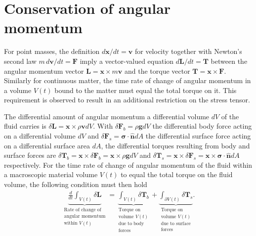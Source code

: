 \section{Conservation of angular momentum}
For point masses, the definition $d\bm{x}/dt=\bm{v}$ for velocity together with Newton's second law $m\,d\bm{v}/dt=\bm{F}$ imply a vector-valued equation $d\bm{L}/dt=\bm{T}$ between the angular momentum vector $\bm{L}=\bm{x}\times m\bm{v}$ and the torque vector $\bm{T}=\bm{x}\times\bm{F}$. Similarly for continuous matter, the time rate of change of angular momentum in a volume $V(t)$ bound to the matter must equal the total torque on it. This requirement is observed to result in an additional restriction on the stress tensor.

The differential amount of angular momentum a differential volume $dV$ of the fluid carries is $\delta\bm{L}=\bm{x}\times \rho\bm{v}dV$. With $\delta\bm{F}_b=\rho\bm{g}dV$ the differential body force acting on a differential volume $dV$ and $\delta\bm{F}_s=\bm{\sigma}\cdot\bm{\hat{n}}dA$ the differential surface force acting on a differential surface area $dA$, the differential torques resulting from body and surface forces are $\delta\bm{T}_b=\bm{x}\times\delta\bm{F}_b=\bm{x}\times\rho\bm{g}dV$ and $\delta\bm{T}_s=\bm{x}\times\delta \bm{F}_s=\bm{x}\times\bm{\sigma}\cdot\bm{\hat{n}}dA$ respectively. For the time rate of change of angular momentum of the fluid within a macroscopic material volume $V(t)$ to equal the total torque on the fluid volume, the following condition must then hold
\begin{align}
    \underbrace{\frac{d}{dt}\int_{V(t)}\delta\bm{L}}_{\substack{\text{Rate of change of}\\\text{angular momentum}\\\text{within $V(t)$}}}=\underbrace{\int_{V(t)}\delta\bm{T}_b}_{\substack{\text{Torque on}\\\text{volume $V(t)$}\\\text{due to body}\\\text{forces}}}+\underbrace{\int_{\partial V(t)}\delta\bm{T}_s}_{\substack{\text{Torque on}\\\text{volume $V(t)$}\\\text{due to surface}\\\text{forces}}}.
\end{align}

